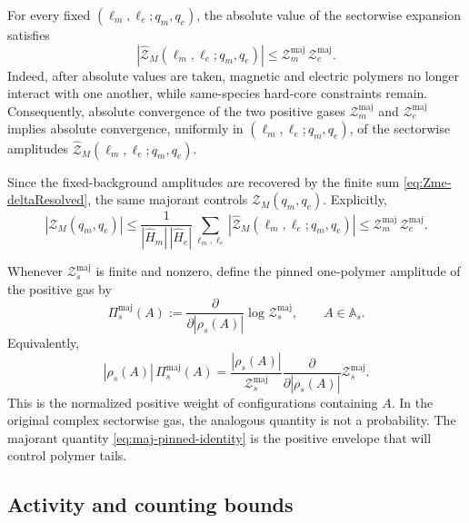 \documentclass[dvipsnames,a4paper]{article}
\numberwithin{equation}{section}
\theoremstyle{definition}
\theoremstyle{remark}
\begin{document}
For every fixed \((\ell_m,\ell_e;q_m,q_e)\), the absolute value of the sectorwise
expansion satisfies
\begin{equation}
	\left|\widehat{\mathcal Z}_M(\ell_m,\ell_e;q_m,q_e)\right|
	\le
	\mathcal Z_m^{\mathrm{maj}}\,
	\mathcal Z_e^{\mathrm{maj}}.
	\label{eq:twisted-sector-majorant-bound}
\end{equation}
Indeed, after absolute values are taken, magnetic and electric polymers no longer interact
with one another, while same-species hard-core constraints remain. Consequently, absolute
convergence of the two positive gases \(\mathcal Z_m^{\mathrm{maj}}\) and
\(\mathcal Z_e^{\mathrm{maj}}\) implies absolute convergence, uniformly in
\((\ell_m,\ell_e;q_m,q_e)\), of the sectorwise amplitudes
\(\widehat{\mathcal Z}_M(\ell_m,\ell_e;q_m,q_e)\).

Since the fixed-background amplitudes are recovered by the finite sum \eqref{eq:Zme-deltaResolved}, the same majorant controls
\(\mathcal Z_M(q_m,q_e)\). Explicitly,
\begin{equation}
	|\mathcal Z_M(q_m,q_e)|
	\le
	\frac{1}{|\widehat H_m|\,|\widehat H_e|}
	\sum_{\ell_m,\ell_e}
	\left|\widehat{\mathcal Z}_M(\ell_m,\ell_e;q_m,q_e)\right|
	\le
	\mathcal Z_m^{\mathrm{maj}}\,
	\mathcal Z_e^{\mathrm{maj}}.
	\label{eq:fixed-charge-majorant-bound}
\end{equation}

Whenever \(\mathcal Z_s^{\mathrm{maj}}\) is finite and nonzero, define the pinned
one-polymer amplitude of the positive gas by
\begin{equation}
	\Pi_s^{\mathrm{maj}}(A)
	:=
	\frac{\partial}{\partial |\rho_s(A)|}
	\log \mathcal Z_s^{\mathrm{maj}},
	\qquad
	A\in\mathbb A_s.
	\label{eq:maj-pinned}
\end{equation}
Equivalently,
\begin{equation}
	|\rho_s(A)|\,\Pi_s^{\mathrm{maj}}(A)
	=
	\frac{|\rho_s(A)|}{\mathcal Z_s^{\mathrm{maj}}}
	\frac{\partial}{\partial |\rho_s(A)|} \mathcal Z_s^{\mathrm{maj}}.
	\label{eq:maj-pinned-identity}
\end{equation}
This is the normalized positive weight of configurations containing \(A\). In the original
complex sectorwise gas, the analogous quantity is not a probability. The majorant
quantity \eqref{eq:maj-pinned-identity} is the positive envelope that will control polymer
tails.




\subsection{Activity and counting bounds}
\label{sec:activity-counting-hypotheses}
\end{document}

